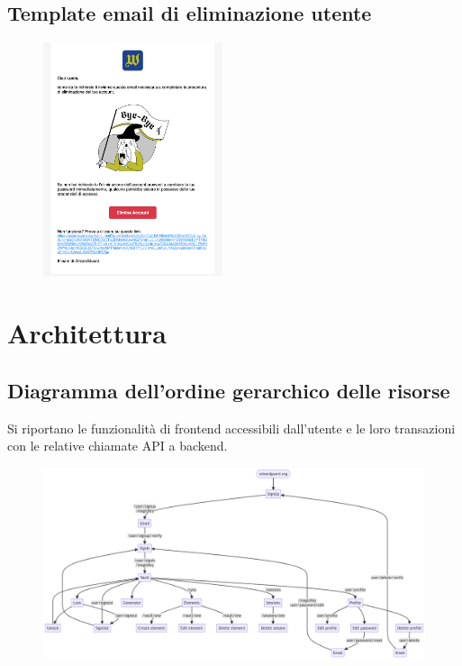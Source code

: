 \documentclass[a4paper]{report}
\begin{document}
\section{Template email di eliminazione utente}
\begin{figure}[H]
        \centering
        \includegraphics[width=0.47\textwidth]{figures/interfaces/goodbyeEmail}
    \end{figure}
\chapter{Architettura}
\section{Diagramma dell'ordine gerarchico delle risorse}
Si riportano le funzionalità di frontend accessibili dall'utente e le loro transazioni con le relative chiamate API a backend.

\begin{figure}[H]
        \centering
        \includegraphics[width=1.0\textwidth]{figures/architectures/hierarchicalOrder}
    \end{figure}
\end{document}
